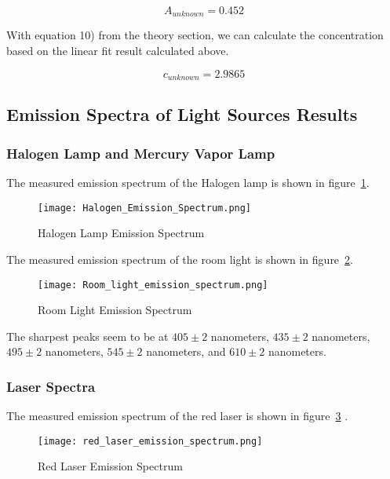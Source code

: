 \documentclass{article}
\begin{document}
\begin{equation}
    A_{unknown} = 0.452
\end{equation}

With equation 10) from the theory section, we can calculate the concentration based on the linear fit result calculated above.

\begin{equation}
    c_{unknown} = 2.9865 
\end{equation}



\subsection{Emission Spectra of Light Sources Results}

\subsubsection{Halogen Lamp and Mercury Vapor Lamp}
The measured emission spectrum of the Halogen lamp is shown in figure~\ref{fig:halogen emission spectrum}.


\begin{figure}[h!]
    \centering
    \texttt{[image: Halogen\_Emission\_Spectrum.png]}
    \caption{Halogen Lamp Emission Spectrum}
    \label{fig:halogen emission spectrum}
\end{figure}

The measured emission spectrum of the room light is shown in figure~\ref{fig:room light emission spectrum}.

\begin{figure}[h!]
    \centering
    \texttt{[image: Room\_light\_emission\_spectrum.png]}
    \caption{Room Light Emission Spectrum}
    \label{fig:room light emission spectrum}
\end{figure}

The sharpest peaks seem to be at $405 \pm 2$ nanometers, $435 \pm 2$ nanometers, $495 \pm 2$ nanometers, $545 \pm 2$ nanometers, and $610 \pm 2$ nanometers.

\subsubsection{Laser Spectra}
The measured emission spectrum of the red laser is shown in figure~\ref{fig:red laser emission} .

\begin{figure}[h!]
    \centering
    \texttt{[image: red\_laser\_emission\_spectrum.png]}
    \caption{Red Laser Emission Spectrum}
    \label{fig:red laser emission}
\end{figure}
\end{document}
